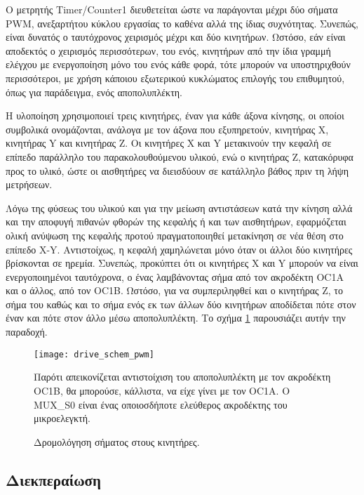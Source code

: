Ο μετρητής \textenglish{Timer\slash Counter1} διευθετείται ώστε να παράγονται
μέχρι δύο σήματα PWM, ανεξαρτήτου κύκλου εργασίας το καθένα αλλά της ίδιας
συχνότητας. Συνεπώς, είναι δυνατός ο ταυτόχρονος χειρισμός μέχρι και δύο
κινητήρων. Ωστόσο, εάν είναι αποδεκτός ο χειρισμός περισσότερων, του ενός,
κινητήρων από την ίδια γραμμή ελέγχου με ενεργοποίηση μόνο του ενός κάθε φορά,
τότε μπορούν να υποστηριχθούν περισσότεροι, με χρήση κάποιου εξωτερικού
κυκλώματος επιλογής του επιθυμητού, όπως για παράδειγμα, ενός αποπολυπλέκτη.

Η υλοποίηση χρησιμοποιεί τρεις κινητήρες, έναν για κάθε άξονα κίνησης, οι οποίοι
συμβολικά ονομάζονται, ανάλογα με τον άξονα που εξυπηρετούν, κινητήρας X,
κινητήρας Y και κινητήρας Z. Οι κινητήρες X και Y μετακινούν την κεφαλή σε
επίπεδο παράλληλο του παρακολουθούμενου υλικού, ενώ ο κινητήρας Z, κατακόρυφα
προς το υλικό, ώστε οι αισθητήρες να διεισδύουν σε κατάλληλο βάθος πριν τη λήψη
μετρήσεων.

Λόγω της φύσεως του υλικού και για την μείωση αντιστάσεων κατά την κίνηση αλλά
και την αποφυγή πιθανών φθορών της κεφαλής ή και των αισθητήρων, εφαρμόζεται
ολική ανύψωση της κεφαλής προτού πραγματοποιηθεί μετακίνηση σε νέα θέση στο
επίπεδο X-Y. Αντιστοίχως, η κεφαλή χαμηλώνεται μόνο όταν οι άλλοι δύο κινητήρες
βρίσκονται σε ηρεμία. Συνεπώς, προκύπτει ότι οι κινητήρες X και Y μπορούν να
είναι ενεργοποιημένοι ταυτόχρονα, ο ένας λαμβάνοντας σήμα από τον ακροδέκτη OC1A
και ο άλλος, από τον OC1B. Ωστόσο, για να συμπεριληφθεί και ο κινητήρας Z, το
σήμα του καθώς και το σήμα ενός εκ των άλλων δύο κινητήρων αποδίδεται πότε στον
έναν και πότε στον άλλο μέσω αποπολυπλέκτη. Το σχήμα
\ref{fig:motor:route_pwm} παρουσιάζει αυτήν την παραδοχή.

\begin{figure}
    \caption{Δρομολόγηση σήματος στους κινητήρες.
    \label{fig:motor:route_pwm}}
    \begin{center}
    \texttt{[image: drive\_schem\_pwm]}
    \end{center}
Παρότι απεικονίζεται αντιστοίχιση του αποπολυπλέκτη με τον ακροδέκτη OC1B, θα
μπορούσε, κάλλιστα, να είχε γίνει με τον OC1A. Ο MUX\_S0 είναι ένας οποιοσδήποτε
ελεύθερος ακροδέκτης του μικροελεγκτή.
\end{figure}


\subsection{Διεκπεραίωση}
\label{subsec:motor:autoshut}

